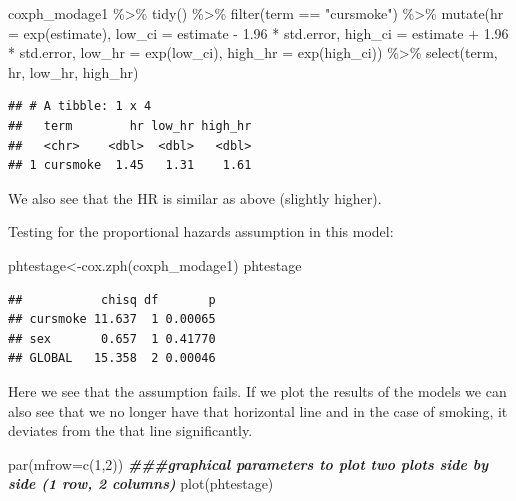 \documentclass[
]{book}
\newenvironment{Shaded}{\begin{snugshade}}{\end{snugshade}}
\newcommand{\AttributeTok}[1]{\textcolor[rgb]{0.77,0.63,0.00}{#1}}
\newcommand{\DecValTok}[1]{\textcolor[rgb]{0.00,0.00,0.81}{#1}}
\newcommand{\DocumentationTok}[1]{\textcolor[rgb]{0.56,0.35,0.01}{\textbf{\textit{#1}}}}
\newcommand{\FloatTok}[1]{\textcolor[rgb]{0.00,0.00,0.81}{#1}}
\newcommand{\FunctionTok}[1]{\textcolor[rgb]{0.00,0.00,0.00}{#1}}
\newcommand{\NormalTok}[1]{#1}
\newcommand{\OtherTok}[1]{\textcolor[rgb]{0.56,0.35,0.01}{#1}}
\newcommand{\SpecialCharTok}[1]{\textcolor[rgb]{0.00,0.00,0.00}{#1}}
\newcommand{\StringTok}[1]{\textcolor[rgb]{0.31,0.60,0.02}{#1}}
\begin{document}
\begin{Shaded}
\begin{Highlighting}[]
\NormalTok{coxph\_modage1 }\SpecialCharTok{\%\textgreater{}\%} 
  \FunctionTok{tidy}\NormalTok{() }\SpecialCharTok{\%\textgreater{}\%} 
  \FunctionTok{filter}\NormalTok{(term }\SpecialCharTok{==} \StringTok{"cursmoke"}\NormalTok{) }\SpecialCharTok{\%\textgreater{}\%} 
  \FunctionTok{mutate}\NormalTok{(}\AttributeTok{hr =} \FunctionTok{exp}\NormalTok{(estimate),}
         \AttributeTok{low\_ci =}\NormalTok{ estimate }\SpecialCharTok{{-}} \FloatTok{1.96} \SpecialCharTok{*}\NormalTok{ std.error, }
         \AttributeTok{high\_ci =}\NormalTok{ estimate }\SpecialCharTok{+} \FloatTok{1.96} \SpecialCharTok{*}\NormalTok{ std.error, }
         \AttributeTok{low\_hr =} \FunctionTok{exp}\NormalTok{(low\_ci), }
         \AttributeTok{high\_hr =} \FunctionTok{exp}\NormalTok{(high\_ci)) }\SpecialCharTok{\%\textgreater{}\%} 
  \FunctionTok{select}\NormalTok{(term, hr, low\_hr, high\_hr)}
\end{Highlighting}
\end{Shaded}

\begin{verbatim}
## # A tibble: 1 x 4
##   term        hr low_hr high_hr
##   <chr>    <dbl>  <dbl>   <dbl>
## 1 cursmoke  1.45   1.31    1.61
\end{verbatim}

We also see that the HR is similar as above (slightly higher).

Testing for the proportional hazards assumption in this model:

\begin{Shaded}
\begin{Highlighting}[]
\NormalTok{phtestage}\OtherTok{\textless{}{-}}\FunctionTok{cox.zph}\NormalTok{(coxph\_modage1)}
\NormalTok{phtestage}
\end{Highlighting}
\end{Shaded}

\begin{verbatim}
##           chisq df       p
## cursmoke 11.637  1 0.00065
## sex       0.657  1 0.41770
## GLOBAL   15.358  2 0.00046
\end{verbatim}

Here we see that the assumption fails. If we plot the results of the models we can also see that we no longer have that horizontal line and in the case of smoking, it deviates from the that line significantly.

\begin{Shaded}
\begin{Highlighting}[]
\FunctionTok{par}\NormalTok{(}\AttributeTok{mfrow=}\FunctionTok{c}\NormalTok{(}\DecValTok{1}\NormalTok{,}\DecValTok{2}\NormalTok{)) }\DocumentationTok{\#\#\#graphical parameters to plot two plots side by side (1 row, 2 columns)}
\FunctionTok{plot}\NormalTok{(phtestage)}
\end{Highlighting}
\end{Shaded}
\end{document}
